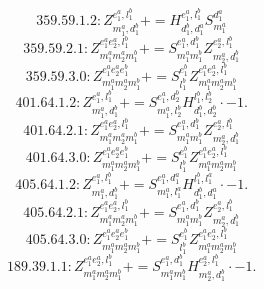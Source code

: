 \documentclass[letterpaper,10pt,fleqn,leqno,onecolumn]{article}
\begin{document}
\begin{equation} \;\;\;\;\;\;  359.59.1.2: Z^{e_{1}^{a},l_{1}^{b}}_{m_{1}^{a},d_{1}^{b}}+=H^{e_{1}^{a},l_{1}^{b}}_{d_{1}^{b},d_{1}^{a}}S^{d_{1}^{a}}_{m_{1}^{a}} \end{equation}
\begin{equation} \;\;\;\;\;\;  359.59.2.1: Z^{e_{1}^{a}e_{2}^{a},l_{1}^{b}}_{m_{1}^{a}m_{2}^{a}m_{1}^{b}}+=S^{e_{1}^{a},d_{1}^{b}}_{m_{1}^{a}m_{1}^{b}}Z^{e_{2}^{a},l_{1}^{b}}_{m_{2}^{a},d_{1}^{b}} \end{equation}
\begin{equation} \;\;\;\;\;\;  359.59.3.0: Z^{e_{1}^{a}e_{2}^{a}e_{1}^{b}}_{m_{1}^{a}m_{2}^{a}m_{1}^{b}}+=S^{e_{1}^{b}}_{l_{1}^{b}}Z^{e_{1}^{a}e_{2}^{a},l_{1}^{b}}_{m_{1}^{a}m_{2}^{a}m_{1}^{b}} \end{equation}
\begin{equation} \;\;\;\;\;\;  401.64.1.2: Z^{e_{1}^{a},l_{1}^{b}}_{m_{1}^{a},d_{1}^{b}}+=S^{e_{1}^{a},d_{2}^{b}}_{m_{1}^{a},l_{2}^{b}}H^{l_{1}^{b},l_{2}^{b}}_{d_{1}^{b},d_{2}^{b}}\cdot -1. \end{equation}
\begin{equation} \;\;\;\;\;\;  401.64.2.1: Z^{e_{1}^{a}e_{2}^{a},l_{1}^{b}}_{m_{1}^{a}m_{2}^{a}m_{1}^{b}}+=S^{e_{1}^{a},d_{1}^{b}}_{m_{1}^{a}m_{1}^{b}}Z^{e_{2}^{a},l_{1}^{b}}_{m_{2}^{a},d_{1}^{b}} \end{equation}
\begin{equation} \;\;\;\;\;\;  401.64.3.0: Z^{e_{1}^{a}e_{2}^{a}e_{1}^{b}}_{m_{1}^{a}m_{2}^{a}m_{1}^{b}}+=S^{e_{1}^{b}}_{l_{1}^{b}}Z^{e_{1}^{a}e_{2}^{a},l_{1}^{b}}_{m_{1}^{a}m_{2}^{a}m_{1}^{b}} \end{equation}
\begin{equation} \;\;\;\;\;\;  405.64.1.2: Z^{e_{1}^{a},l_{1}^{b}}_{m_{1}^{a},d_{1}^{b}}+=S^{e_{1}^{a},d_{1}^{a}}_{m_{1}^{a},l_{1}^{a}}H^{l_{1}^{b},l_{1}^{a}}_{d_{1}^{b},d_{1}^{a}}\cdot -1. \end{equation}
\begin{equation} \;\;\;\;\;\;  405.64.2.1: Z^{e_{1}^{a}e_{2}^{a},l_{1}^{b}}_{m_{1}^{a}m_{2}^{a}m_{1}^{b}}+=S^{e_{1}^{a},d_{1}^{b}}_{m_{1}^{a}m_{1}^{b}}Z^{e_{2}^{a},l_{1}^{b}}_{m_{2}^{a},d_{1}^{b}} \end{equation}
\begin{equation} \;\;\;\;\;\;  405.64.3.0: Z^{e_{1}^{a}e_{2}^{a}e_{1}^{b}}_{m_{1}^{a}m_{2}^{a}m_{1}^{b}}+=S^{e_{1}^{b}}_{l_{1}^{b}}Z^{e_{1}^{a}e_{2}^{a},l_{1}^{b}}_{m_{1}^{a}m_{2}^{a}m_{1}^{b}} \end{equation}
\begin{equation} \;\;\;\;\;\;  189.39.1.1: Z^{e_{1}^{a}e_{2}^{a},l_{1}^{b}}_{m_{1}^{a}m_{2}^{a}m_{1}^{b}}+=S^{e_{1}^{a},d_{1}^{b}}_{m_{1}^{a}m_{1}^{b}}H^{e_{2}^{a},l_{1}^{b}}_{m_{2}^{a},d_{1}^{b}}\cdot -1. \end{equation}
\end{document}
